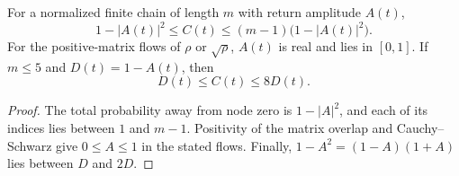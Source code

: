 \begin{lemma}\label{lem:return}
For a normalized finite chain of length $m$ with return amplitude $A(t)$,
\begin{equation}\label{eq:return-bound}
 1-|A(t)|^2\le C(t)\le(m-1)\bigl(1-|A(t)|^2\bigr).
\end{equation}
For the positive-matrix flows of $\rho$ or $\sqrt\rho$, $A(t)$ is real
and lies in $[0,1]$. If $m\le5$ and $D(t)=1-A(t)$, then
\begin{equation}\label{eq:loss-bound}
 D(t)\le C(t)\le8D(t).
\end{equation}
\end{lemma}
\begin{proof}
The total probability away from node zero is $1-|A|^2$, and each of its
indices lies between $1$ and $m-1$. Positivity of the matrix overlap and
Cauchy--Schwarz give $0\le A\le1$ in the stated flows. Finally,
$1-A^2=(1-A)(1+A)$ lies between $D$ and $2D$.
\end{proof}
